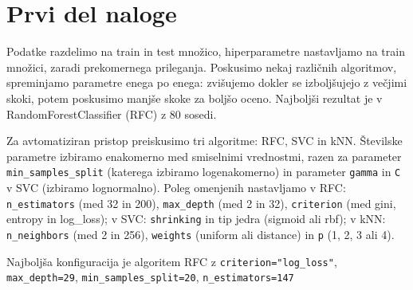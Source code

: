 \documentclass{article}
\begin{document}
\section{Prvi del naloge}
Podatke razdelimo na train in test množico, hiperparametre nastavljamo na train množici, zaradi prekomernega prileganja. Poskusimo nekaj različnih algoritmov, spreminjamo parametre enega po enega: zvišujemo dokler se izboljšujejo z večjimi skoki, potem poskusimo manjše skoke za boljšo oceno. Najboljši rezultat je v RandomForestClassifier (RFC) z 80 sosedi.

Za avtomatiziran pristop preiskusimo tri algoritme: RFC, SVC in kNN. Številske parametre izbiramo enakomerno med smiselnimi vrednostmi, razen za parameter \verb|min_samples_split| (katerega izbiramo logenakomerno) in parameter \verb|gamma| in \verb|C| v SVC (izbiramo lognormalno). Poleg omenjenih nastavljamo v RFC: \verb|n_estimators| (med 32 in 200), \verb|max_depth| (med 2 in 32), \verb|criterion| (med gini, entropy in log\_loss); v SVC: \verb|shrinking| in tip jedra (sigmoid ali rbf); v kNN: \verb|n_neighbors| (med 2 in 256), \verb|weights| (uniform ali distance) in \verb|p| (1, 2, 3 ali 4).

Najboljša konfiguracija je algoritem RFC z \verb|criterion="log_loss"|, \verb|max_depth=29|, \verb|min_samples_split=20|, \verb|n_estimators=147|
\end{document}
